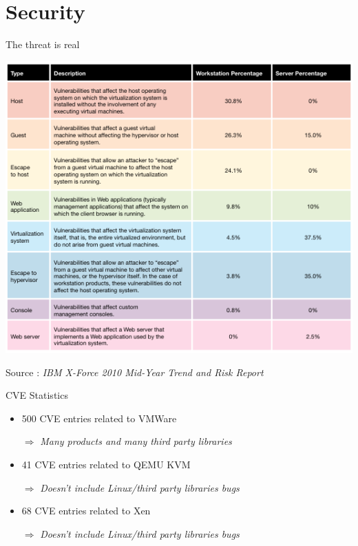 \documentclass{beamer}
\begin{document}
\section{Security}
\begin{frame}{The threat is real}
	\begin{center}
	\includegraphics[scale=0.3]{table-vuln}
	\end{center}
	Source : \emph{IBM X-Force 2010 Mid-Year Trend and Risk Report}
\end{frame}

\begin{frame}{CVE Statistics}
	\begin{itemize}
	\item 500 CVE entries related to VMWare
	\item[$\Rightarrow$]\emph{Many products and many third party libraries}\\
	\item 41 CVE entries related to QEMU KVM
	\item[$\Rightarrow$]\emph{Doesn't include Linux/third party libraries bugs}\\
	\item 68 CVE entries related to Xen
	\item[$\Rightarrow$]\emph{Doesn't include Linux/third party libraries bugs}\\
	\end{itemize}
\end{frame}
\end{document}

